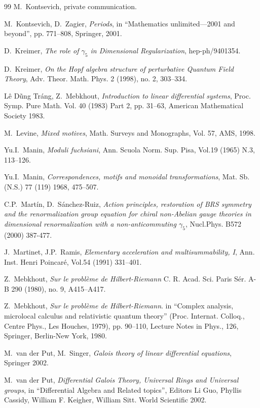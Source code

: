 \documentclass[10pt]{amsart}
\numberwithin{equation}{section}
\begin{document}
\begin{thebibliography}{99}
 M.~Kontsevich, private communication.

 M.~Kontsevich, D.~Zagier, {\em Periods}, in
``Mathematics unlimited---2001 and beyond'', pp. 771--808,
Springer, 2001.

 D.~Kreimer, {\it The role of $\gamma_5$
in Dimensional Regularization},
   hep-ph/9401354.

 D.~Kreimer, {\it On the Hopf algebra structure of
 perturbative Quantum Field Theory},
  Adv. Theor. Math. Phys. 2 (1998), no. 2, 303--334.

 L\^e D\~ung Tr\'ang, Z.~Mebkhout, {\em Introduction to
linear differential systems}, Proc. Symp. Pure Math. Vol. 40 (1983)
Part 2, pp. 31--63, American Mathematical Society 1983.

 M.~Levine, {\em Mixed motives}, Math. Surveys and
Monographs, Vol. 57, AMS, 1998.

 Yu.I.~Manin, {\em Moduli fuchsiani}, Ann. Scuola Norm.
Sup. Pisa, Vol.19  (1965) N.3, 113--126.

  Yu.I.~Manin, {\em Correspondences, motifs and monoidal transformations},
Mat. Sb. (N.S.) 77 (119) 1968, 475--507.

 C.P.~Mart\'in, D.~S\'anchez-Ruiz, {\em Action
principles, restoration of BRS symmetry and the renormalization group
equation for chiral non-Abelian gauge theories in dimensional
renormalization with a non-anticommuting $\gamma_5$}, Nucl.Phys. B572
(2000) 387-477.

 J.~Martinet, J.P.~Ramis, {\em Elementary acceleration and
   multisummability, I}, Ann. Inst. Henri Poincar\'e, Vol.54 (1991)
   331--401.

 Z.~Mebkhout, {\em Sur le probl\`eme de Hilbert-Riemann}
C. R. Acad. Sci. Paris S\'er. A-B  290  (1980), no. 9,
A415--A417.

 Z.~Mebkhout, {\em  Sur le probl\`eme de Hilbert-Riemann}. in
``Complex analysis, microlocal calculus and relativistic quantum
theory'' (Proc. Internat. Colloq., Centre Phys., Les Houches, 1979),
pp. 90--110, Lecture Notes in Phys., 126,
Springer, Berlin-New York, 1980.

 M.~van der Put, M.~Singer, {\em Galois theory
of linear differential equations}, Springer 2002.

 M.~van der Put, {\em Differential Galois Theory,
Universal Rings and Universal
groups}, in ``Differential Algebra and Related topics'', Editors Li Guo,
Phyllis Cassidy, William F. Keigher, William Sitt. World Scientific
2002.


\end{thebibliography}
\end{document}
